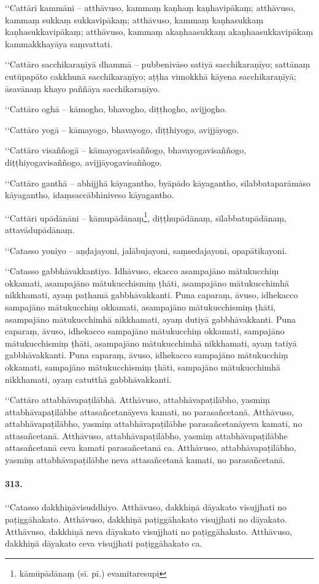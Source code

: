 ‘‘Cattāri kammāni – atthāvuso, kammaṃ kaṇhaṃ kaṇhavipākaṃ; atthāvuso, kammaṃ sukkaṃ sukkavipākaṃ; atthāvuso, kammaṃ kaṇhasukkaṃ kaṇhasukkavipākaṃ; atthāvuso, kammaṃ akaṇhaasukkaṃ akaṇhaasukkavipākaṃ kammakkhayāya saṃvattati.

‘‘Cattāro sacchikaraṇīyā dhammā – pubbenivāso satiyā sacchikaraṇīyo; sattānaṃ cutūpapāto cakkhunā sacchikaraṇīyo; aṭṭha vimokkhā kāyena sacchikaraṇīyā; āsavānaṃ khayo paññāya sacchikaraṇīyo.

‘‘Cattāro oghā – kāmogho, bhavogho, diṭṭhogho, avijjogho.

‘‘Cattāro yogā – kāmayogo, bhavayogo, diṭṭhiyogo, avijjāyogo.

‘‘Cattāro visaññogā – kāmayogavisaññogo, bhavayogavisaññogo, diṭṭhiyogavisaññogo, avijjāyogavisaññogo.

‘‘Cattāro ganthā – abhijjhā kāyagantho, byāpādo kāyagantho, sīlabbataparāmāso kāyagantho, idaṃsaccābhiniveso kāyagantho.

‘‘Cattāri upādānāni – kāmupādānaṃ\footnote{kāmūpādānaṃ (sī. pī.) evamitaresupi}, diṭṭhupādānaṃ, sīlabbatupādānaṃ, attavādupādānaṃ.

‘‘Catasso yoniyo – aṇḍajayoni, jalābujayoni, saṃsedajayoni, opapātikayoni.

‘‘Catasso gabbhāvakkantiyo. Idhāvuso, ekacco asampajāno mātukucchiṃ okkamati, asampajāno mātukucchismiṃ ṭhāti, asampajāno mātukucchimhā nikkhamati, ayaṃ paṭhamā gabbhāvakkanti. Puna caparaṃ, āvuso, idhekacco sampajāno mātukucchiṃ okkamati, asampajāno mātukucchismiṃ ṭhāti, asampajāno mātukucchimhā nikkhamati, ayaṃ dutiyā gabbhāvakkanti. Puna caparaṃ, āvuso, idhekacco sampajāno mātukucchiṃ okkamati, sampajāno mātukucchismiṃ ṭhāti, asampajāno mātukucchimhā nikkhamati, ayaṃ tatiyā gabbhāvakkanti. Puna caparaṃ, āvuso, idhekacco sampajāno mātukucchiṃ okkamati, sampajāno mātukucchismiṃ ṭhāti, sampajāno mātukucchimhā nikkhamati, ayaṃ catutthā gabbhāvakkanti.

‘‘Cattāro attabhāvapaṭilābhā. Atthāvuso, attabhāvapaṭilābho, yasmiṃ attabhāvapaṭilābhe attasañcetanāyeva kamati, no parasañcetanā. Atthāvuso, attabhāvapaṭilābho, yasmiṃ attabhāvapaṭilābhe parasañcetanāyeva kamati, no attasañcetanā. Atthāvuso, attabhāvapaṭilābho, yasmiṃ attabhāvapaṭilābhe attasañcetanā ceva kamati parasañcetanā ca. Atthāvuso, attabhāvapaṭilābho, yasmiṃ attabhāvapaṭilābhe neva attasañcetanā kamati, no parasañcetanā.

\paragraph{313.} ‘‘Catasso dakkhiṇāvisuddhiyo. Atthāvuso, dakkhiṇā dāyakato visujjhati no paṭiggāhakato. Atthāvuso, dakkhiṇā paṭiggāhakato visujjhati no dāyakato. Atthāvuso, dakkhiṇā neva dāyakato visujjhati no paṭiggāhakato. Atthāvuso, dakkhiṇā dāyakato ceva visujjhati paṭiggāhakato ca.

